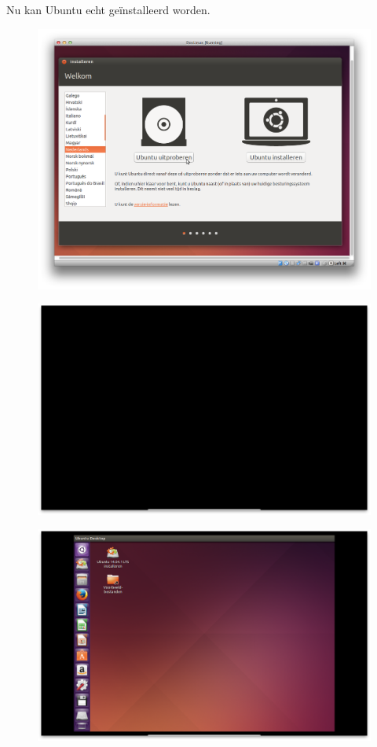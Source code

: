 \documentclass[11pt, a4paper]{article}
\begin{document}
Nu kan Ubuntu echt ge\"installeerd worden.

\begin{figure}[H]
	\centering
	\includegraphics[width=\textwidth]{./IMG/H}
\end{figure}

\begin{figure}[H]
	\centering
	\includegraphics[width=\textwidth]{./IMG/I}
\end{figure}

\begin{figure}[H]
	\centering
	\includegraphics[width=\textwidth]{./IMG/J}
\end{figure}
\end{document}
